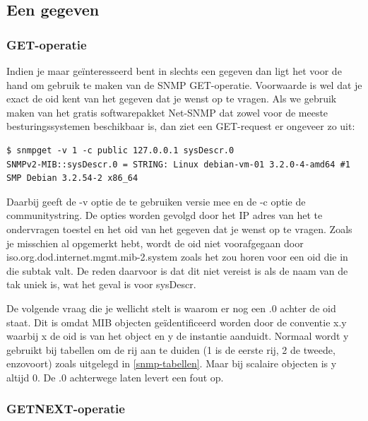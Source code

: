 \subsection{Een gegeven}

\subsubsection{GET-operatie}

Indien je maar geïnteresseerd bent in slechts een gegeven dan ligt het voor de hand om gebruik te maken van de SNMP GET-operatie.
Voorwaarde is wel dat je exact de \gls{oid} kent van het gegeven dat je wenst op te vragen.
Als we gebruik maken van het gratis softwarepakket Net-SNMP dat zowel voor de meeste besturingssystemen beschikbaar is,
dan ziet een GET-request er ongeveer zo uit:

\begin{lstlisting}[float=h, caption={SNMP GET-opdracht}, label=netsnmp-get]
$ snmpget -v 1 -c public 127.0.0.1 sysDescr.0
SNMPv2-MIB::sysDescr.0 = STRING: Linux debian-vm-01 3.2.0-4-amd64 #1 SMP Debian 3.2.54-2 x86_64
\end{lstlisting}

Daarbij geeft de -v optie de te gebruiken versie mee en de -c optie de communitystring.
De opties worden gevolgd door het IP adres van het te ondervragen toestel en het \gls{oid} van het gegeven dat je wenst op te vragen.
Zoals je misschien al opgemerkt hebt, wordt de \gls{oid} niet voorafgegaan door iso.org.dod.internet.mgmt.mib-2.system zoals het zou horen
voor een \gls{oid} die in die subtak valt. De reden daarvoor is dat dit niet vereist is als de naam van de tak uniek is, wat het geval is voor sysDescr.

De volgende vraag die je wellicht stelt is waarom er nog een .0 achter de \gls{oid} staat.
Dit is omdat MIB objecten geïdentificeerd worden door de conventie x.y waarbij x de \gls{oid} is van het object
en y de instantie aanduidt. Normaal wordt y gebruikt bij tabellen om de rij aan te duiden (1 is de eerste rij, 2 de tweede, enzovoort) zoals
uitgelegd in \cref{snmp-tabellen}.
Maar bij scalaire objecten is y altijd 0. De .0 achterwege laten levert een fout op.\cite{essentialsnmp}

\subsubsection{GETNEXT-operatie}

